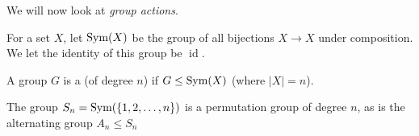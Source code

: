 \documentclass[a4paper]{scrreprt}
\begin{document}
We will now look at \emph{group actions}.

\begin{definition}
	For a set $X$, let $\operatorname{Sym}(X)$ be the group of all bijections $X \rightarrow X$ under composition. We let the identity of this group be $\operatorname{id}$.
\end{definition}

\begin{definition}
	A group $G$ is a  (of degree $n$) if $G \leq \operatorname{Sym}(X)$ (where $|X| = n$).
\end{definition}

\begin{example}
	The group $S_n = \operatorname{Sym}(\{1, 2, \dots, n\})$ is a permutation group of degree $n$, as is the alternating group $A_n \leq S_n$
\end{example}
\end{document}
